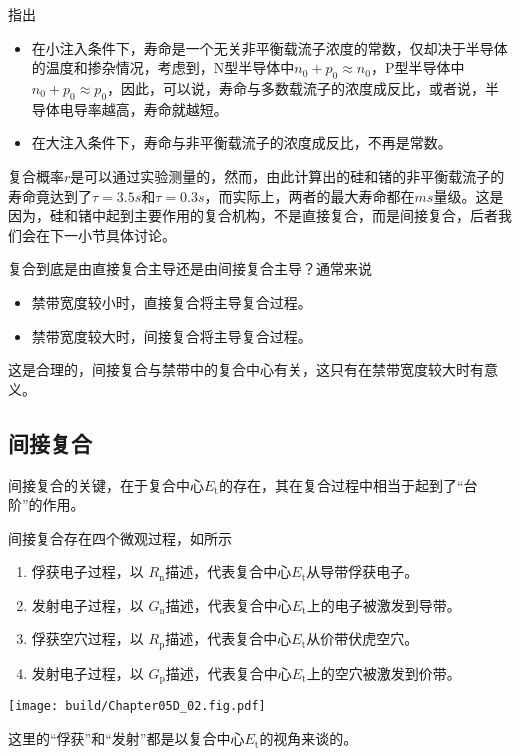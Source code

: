 指出
\begin{itemize}
    \item 在小注入条件下，寿命是一个无关非平衡载流子浓度的常数，仅却决于半导体的温度和掺杂情况，考虑到，N型半导体中$n_0+p_0\approx n_0$，P型半导体中$n_0+p_0\approx p_0$，因此，可以说，寿命与多数载流子的浓度成反比，或者说，半导体电导率越高，寿命就越短。
    \item 在大注入条件下，寿命与非平衡载流子的浓度成反比，不再是常数。
\end{itemize}
复合概率$r$是可以通过实验测量的，然而，由此计算出的硅和锗的非平衡载流子的寿命竟达到了$\tau=3.5\si{s}$和$\tau=0.3\si{s}$，而实际上，两者的最大寿命都在$\si{ms}$量级。这是因为，硅和锗中起到主要作用的复合机构，不是直接复合，而是间接复合，后者我们会在下一小节具体讨论。

复合到底是由直接复合主导还是由间接复合主导？通常来说
\begin{itemize}
    \item 禁带宽度较小时，直接复合将主导复合过程。
    \item 禁带宽度较大时，间接复合将主导复合过程。
\end{itemize}
这是合理的，间接复合与禁带中的复合中心有关，这只有在禁带宽度较大时有意义。

\subsection{间接复合}
间接复合的关键，在于复合中心$E_\text{t}$的存在，其在复合过程中相当于起到了“台阶”的作用。

间接复合存在四个微观过程，如所示
\begin{enumerate}
    \item 俘获电子过程，以 $R_\text{n}$描述，代表复合中心$E_\text{t}$从导带俘获电子。
    \item 发射电子过程，以 $G_\text{n}$描述，代表复合中心$E_\text{t}$上的电子被激发到导带。
    \item 俘获空穴过程，以 $R_\text{p}$描述，代表复合中心$E_\text{t}$从价带伏虎空穴。
    \item 发射电子过程，以 $G_\text{p}$描述，代表复合中心$E_\text{t}$上的空穴被激发到价带。
\end{enumerate}
\begin{Figure}[间接复合的四个微观过程]
    \texttt{[image: build/Chapter05D\_02.fig.pdf]}
\end{Figure}
这里的“俘获”和“发射”都是以复合中心$E_\text{t}$的视角来谈的。

